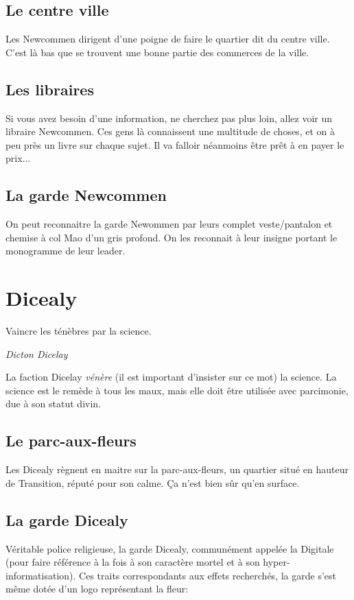 \documentclass{book}
\begin{document}
\subsection{Le centre ville}
Les Newcommen dirigent d'une poigne de faire le quartier dit du centre ville. C'est là bas que se trouvent une bonne partie des commerces de la ville.

\subsection{Les libraires}
Si vous avez besoin d'une information, ne cherchez pas plus loin, allez voir un libraire Newcommen. Ces gens là connaissent une multitude de choses, et on à peu près un livre sur chaque sujet. Il va falloir néanmoins être prêt à en payer le prix...

\subsection{La garde Newcommen}
On peut reconnaitre la garde Newommen par leurs complet veste/pantalon et chemise à col Mao d'un gris profond. On les reconnait à leur insigne portant le monogramme de leur leader.
\begin{figure}[H]
    \centering
    \def\svgwidth{10em}
    
\end{figure}

\section{Dicealy}
\epigraph{Vaincre les ténèbres par la science.}{\textit{Dicton Dicelay}}
La faction Dicelay \emph{vénère} (il est important d'insister sur ce mot) la science. La science est le remède à tous les maux, mais elle doit être utilisée avec parcimonie, due à son statut divin.

\subsection{Le parc-aux-fleurs}
Les Dicealy règnent en maitre sur la parc-aux-fleurs, un quartier situé en hauteur de Transition, réputé pour son calme. Ça n'est bien sûr qu'en surface.

\subsection{La garde Dicealy}
Véritable police religieuse, la garde Dicealy, communément appelée la Digitale (pour faire référence à la fois à son caractère mortel et à son hyper-informatisation).
Ces traits correspondants aux effets recherchés, la garde s'est même dotée d'un logo représentant la fleur:
\begin{figure}[H]
    \centering
    \def\svgwidth{10em}
    
\end{figure}
\end{document}
